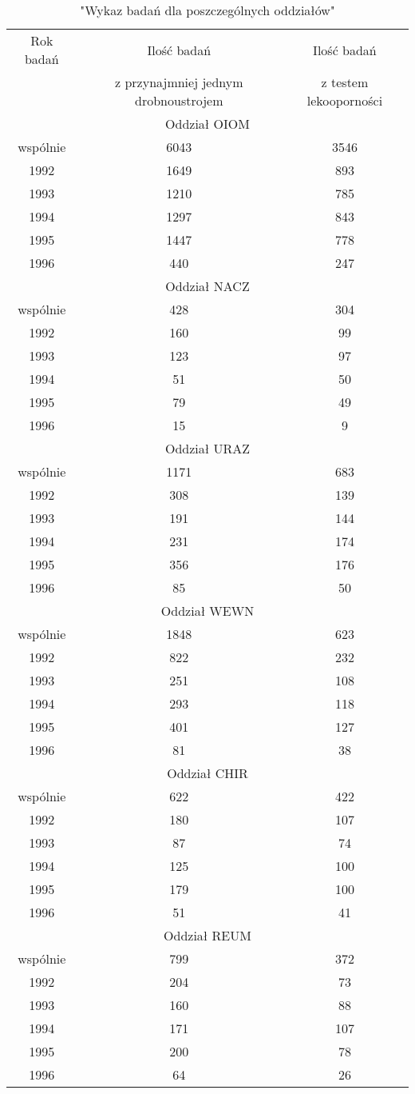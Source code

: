 \documentclass[a4paper,11pt]{article}
\begin{document}
\begin{table}[h]
\begin{center}
\caption{"Wykaz badań dla poszczególnych oddziałów"}
\begin{tabular}{c|c|c}
\hline
Rok badań & Ilość badań & Ilość badań \\
& z przynajmniej jednym drobnoustrojem &z testem lekooporności \\
\hline \multicolumn{3}{|c|}{Oddział OIOM} \\ \hline
wspólnie &6043 &3546 \\
1992 &1649 &893 \\
1993 &1210 &785 \\
1994 &1297 &843 \\
1995 &1447 &778 \\
1996 &440 &247 \\
\hline \multicolumn{3}{|c|}{Oddział NACZ} \\ \hline
wspólnie &428 &304 \\
1992 &160 &99 \\
1993 &123 &97 \\
1994 &51 &50 \\
1995 &79 &49 \\
1996 &15 &9 \\
\hline \multicolumn{3}{|c|}{Oddział URAZ} \\ \hline
wspólnie &1171 &683 \\
1992 &308 &139 \\
1993 &191 &144 \\
1994 &231 &174 \\
1995 &356 &176 \\
1996 &85 &50 \\
\hline \multicolumn{3}{|c|}{Oddział WEWN} \\ \hline
wspólnie &1848 &623 \\
1992 &822 &232 \\
1993 &251 &108 \\
1994 &293 &118 \\
1995 &401 &127 \\
1996 &81 &38 \\
\hline \multicolumn{3}{|c|}{Oddział CHIR} \\ \hline
wspólnie &622 &422 \\
1992 &180 &107 \\
1993 &87 &74 \\
1994 &125 &100 \\
1995 &179 &100 \\
1996 &51 &41 \\
\hline \multicolumn{3}{|c|}{Oddział REUM} \\ \hline
wspólnie &799 &372 \\
1992 &204 &73 \\
1993 &160 &88 \\
1994 &171 &107 \\
1995 &200 &78 \\
1996 &64 &26 \\

\hline
\end{tabular}
\end{center}
\end{table}
\end{document}
